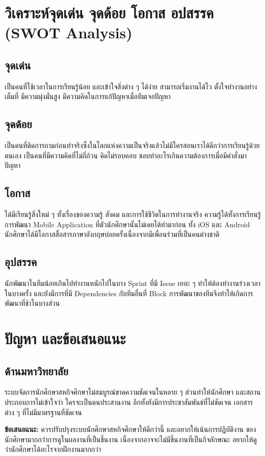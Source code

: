 \section{วิเคราะห์จุดเด่น จุดด้อย โอกาส อปสรรค (SWOT Analysis)}
\subsection{จุดเด่น}  
เป็นคนที่ใช้เวลาในการเรียนรู้น้อย และเข้าใจสิ่งต่าง ๆ ได้ง่าย สามารถเริ่มงานได้ไว ตั้งใจทำงานอย่างเต็มที่
มีความมุ่งมั่นสูง มีความคิดในการแก้ปัญหาเมื่อทีมเจอปัญหา

\subsection{จุดด้อย}
เป็นคนที่ติดการถามก่อนทำจริงซึ่งในโลกแห่งความเป็นจริงแล้วไม่มีใครสอนเราได้ดีกว่าการเรียนรู้ด้วยตนเอง
เป็นคนที่มีความคิดที่ไม่ถี่ถ้วน คิดไม่รอบคอบ ชอบทำอะไรเกินความต้องการเมื่อมีคำสั่งมา
ปัญหา

\subsection{โอกาส}
ได้มีเรียนรู้สิ่งใหม่ ๆ ทั้งเรื่องของความรู้ สังคม และการใช้ชีวิตในการทำงานจริง
ความรู้ได้ทั้งการเรียนรู้การพัฒนา Mobile Application ที่ตัวนักศึกษานั้นไม่เคยได้ทำมาก่อน
ทั้ง iOS และ Android นักศึกษาได้มีโอกาสสื่อสารภาษาอังกฤษบ่อยครั้งเนื่องจากมีเพื่อนร่วมที่เป็นคนต่างชาติ

\subsection{อุปสรรค}
นักพัฒนาในทีมน้อยเกินไปทำงานหนักไปในบาง Sprint ที่มี Issue เยอะ ๆ ทำให้ต้องทำงานร่วงเวลาในบางครั้ง
และยังมีการที่มี Dependencies กับทีมอื่นที่ Block การพัฒนาของทีมจึงทำให้เกิดการพัฒนาที่ช้าในบางส่วน

\section{ปัญหา และข้อเสนอแนะ}
\subsection{ด้านมหาวิทยาลัย}
ระบบจัดการนักศึกษาสหกิจศึกษาไม่สมบูรณ์ขาดความชัดเจนในหลาย ๆ ส่วนทำให้นักศึกษา และสถานประกอบการไม่เข้าใจว่า
ใครจะเป็นคนประสานงาน อีกทั้งยังมีการประชาสัมพันธ์ที่ไม่ชัดเจน เอกสารต่าง ๆ ที่ไม่มีมาตรฐานที่ชัดเจน 

\noindent \textbf{ข้อเสนอแนะ:} ควรปรับปรุงระบบนักศึกษาสหกิจศึกษาให้ดีกว่านี้ และอยากให้เน้นการปฏิบัติงาน
ของนักศึกษามากกว่าการดูในผลงานที่เป็นชิ้นงาน เนื่องจากอาจจะไม่มีชิ้นงานที่เป็นกิจลักษณะ 
อยากให้ดูว่านักศึกษาได้อะไรจากฝึกงานมากกว่า

